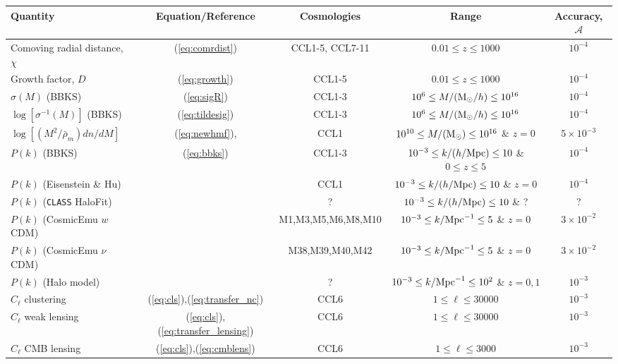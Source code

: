 
%
\begin{sidewaystable*}[!htp]
  \centering
  \begin{tabular}{ l|c c c c}
    \hline
    Quantity & Equation/Reference & Cosmologies & Range & Accuracy, $\mathcal{A}$ \\
    \hline
    Comoving radial distance, $\chi$ & (\ref{eq:comrdist}) & CCL1-5, CCL7-11 & $0.01 \leq z\leq 1000$ &  $10^{-4}$\\
    Growth factor, $D$ & (\ref{eq:growth}) & CCL1-5 &  $0.01 \leq z\leq 1000 $ &  $10^{-4}$\\
    $\sigma(M)$ (BBKS) & (\ref{eq:sigR}) & CCL1-3 &  $10^6\leq M/({\rm M}_\odot/h)\leq 10^{16}$ &  $10^{-4}$\\
    $\log[\sigma^{-1}(M)]$ (BBKS) & (\ref{eq:tildesig}) & CCL1-3 &  $10^6\leq M/({\rm M}_\odot/h)\leq 10^{16}$ &  $10^{-4}$\\
    $\log[(M^2/\bar{\rho}_m)dn/dM]$  & (\ref{eq:newhmf}), \citet{Tinker2010} & CCL1 & $10^{10}\leq M/({\rm M}_\odot)\leq 10^{16}$ \& $z=0$ & $5\times 10^{-3}$\\
    $P(k)$ (BBKS) & (\ref{eq:bbks}) & CCL1-3 & $10^{-3}\leq k/(h/{\rm Mpc})\leq 10$ \& $0\leq z\leq 5$ &  $10^{-4}$\\
    $P(k)$ (Eisenstein \& Hu) & \citet{1998ApJ...496..605E}  & CCL1 & $10^{-3}\leq k/(h/{\rm Mpc})\leq 10$ \& $z=0$ & $10^{-4}$ \\
    $P(k)$ ({\tt CLASS} HaloFit) & \citet{CLASS_halofit}  & ? & $10^{-3}\leq k/(h/{\rm Mpc})\leq 10$ \& ? & ? \\
    $P(k)$ (CosmicEmu $w$CDM) & \citet{Lawrence17} & M1,M3,M5,M6,M8,M10 & $10^{-3}\leq k/{\rm Mpc}^{-1}\leq 5$ \& $z=0$  & $3\times 10^{-2}$ \\
    $P(k)$ (CosmicEmu $\nu$CDM) & \citet{Lawrence17} & M38,M39,M40,M42 & $10^{-3}\leq k/{\rm Mpc}^{-1}\leq 5$ \& $z=0$ & $3\times 10^{-2}$ \\
    $P(k)$ (Halo model) & \citet{Cooray2002} & ? & $10^{-3}\leq k/{\rm Mpc}^{-1}\leq 10^{2}$ \& $z=0,1$ & $10^{-3}$ \\
    $C_\ell$ clustering & (\ref{eq:cls}),(\ref{eq:transfer_nc})& CCL6 &$1 \leq \ell\leq 30000$ &  $10^{-3}$\\
    $C_\ell$ weak lensing & (\ref{eq:cls}),(\ref{eq:transfer_lensing})& CCL6 &$1 \leq \ell\leq 30000$ &  $10^{-3}$\\
    $C_\ell$ CMB lensing &(\ref{eq:cls}),(\ref{eq:cmblens}) & CCL6 & $1 \leq \ell\leq 3000$& $10^{-3}$ \\

\end{tabular}
\end{sidewaystable*}

